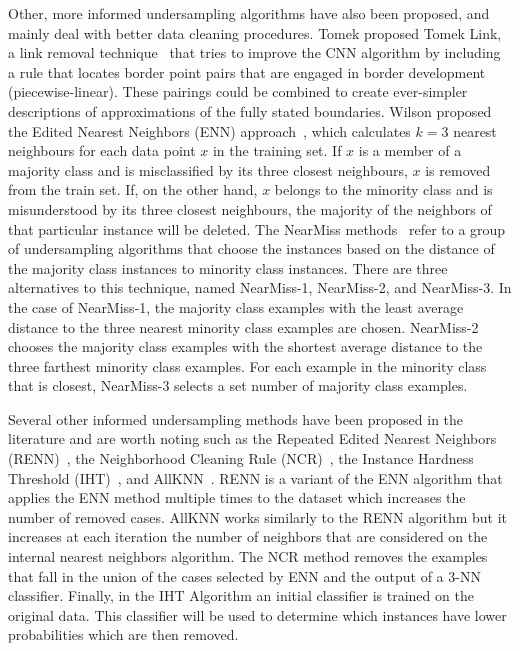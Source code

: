 \documentclass{article}
\begin{document}
Other, more informed undersampling algorithms have also been proposed, and mainly deal with better data cleaning procedures. Tomek proposed Tomek Link, a link removal technique~\cite{tomekTwoModificationsCNN1976} that tries to improve the CNN algorithm by including a rule that locates border point pairs that are engaged in border development (piecewise-linear). These pairings could be combined to create ever-simpler descriptions of approximations of the fully stated boundaries. Wilson proposed the Edited Nearest Neighbors (ENN) approach~\cite{wilsonAsymptoticPropertiesNearest1972}, which calculates $k=3$ nearest neighbours for each data point $x$ in the training set. If $x$ is a member of a majority class and is misclassified by its three closest neighbours, $x$ is removed from the train set. If, on the other hand, $x$ belongs to the minority class and is misunderstood by its three closest neighbours, the majority of the neighbors of that particular instance will be deleted. The NearMiss methods~\cite{maniKNNApproachUnbalanced2003a} refer to a group of undersampling algorithms that choose the instances based on the distance of the majority class instances to minority class instances. There are three alternatives to this technique, named NearMiss-1, NearMiss-2, and NearMiss-3. In the case of NearMiss-1, the majority class examples with the least average distance to the three nearest minority class examples are chosen. NearMiss-2 chooses the majority class examples with the shortest average distance to the three farthest minority class examples. For each example in the minority class that is closest, NearMiss-3 selects a set number of majority class examples.

Several other informed undersampling methods have been proposed in the literature and are worth noting such as the Repeated Edited Nearest Neighbors (RENN)~\cite{tomekExperimentEditedNearestNeighbor1976}, the Neighborhood Cleaning Rule (NCR)~\cite{laurikkalaImprovingIdentificationDifficult2001}, the Instance Hardness Threshold (IHT)~\cite{smithInstanceLevelAnalysis2014}, and AllKNN~\cite{tomekExperimentEditedNearestNeighbor1976}. RENN is a variant of the ENN algorithm that applies the ENN method multiple times to the dataset which increases the number of removed cases. AllKNN works similarly to the RENN algorithm but it increases at each iteration the number of neighbors that are considered on the internal nearest neighbors algorithm. The NCR method removes the examples that fall in the union of the cases selected by ENN and the output of a 3-NN classifier. Finally, in the IHT Algorithm an initial classifier is trained on the original data. This classifier will be used to determine which instances have lower probabilities which are then removed.
\end{document}
